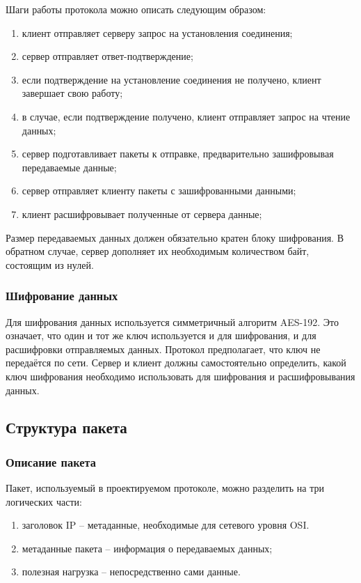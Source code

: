 Шаги работы протокола можно описать следующим образом:

\begin{enumerate}
	\item клиент отправляет серверу запрос на установления соединения;
	\item сервер отправляет ответ-подтверждение;
	\item если подтверждение на установление соединения не получено, клиент завершает свою работу;
	\item в случае, если подтверждение получено, клиент отправляет запрос на чтение данных;
	\item сервер подготавливает пакеты к отправке, предварительно зашифровывая передаваемые данные;
	\item сервер отправляет клиенту пакеты с зашифрованными данными;
	\item клиент расшифровывает полученные от сервера данные;
\end{enumerate}

Размер передаваемых данных должен обязательно кратен блоку шифрования. В обратном случае, сервер дополняет их необходимым количеством байт, состоящим из нулей.

\subsubsection{Шифрование данных}

Для шифрования данных используется симметричный алгоритм AES-192. Это означает, что один и тот же ключ используется и для шифрования, и для расшифровки отправляемых данных. Протокол предполагает, что ключ не передаётся по сети. Сервер и клиент должны самостоятельно определить, какой ключ шифрования необходимо использовать для шифрования и расшифровывания данных.

\subsection{Структура пакета}

\subsubsection{Описание пакета}

Пакет, используемый в проектируемом протоколе, можно разделить на три логических части:

\begin{enumerate}
	\item заголовок IP -- метаданные, необходимые для сетевого уровня OSI.
	\item метаданные пакета  -- информация о передаваемых данных;
	\item полезная нагрузка -- непосредственно сами данные.
\end{enumerate}

